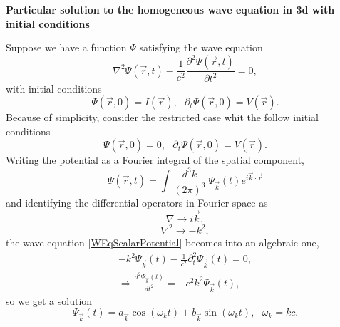 \documentclass[12pt,a4paper]{article}
\newcommand{\der}[2]{\frac{d #1}{d #2}} %
\begin{document}
\textbf{Particular solution to the homogeneous wave equation in 3d with initial conditions}

Suppose we have a function $\Psi$ satisfying the wave equation
\begin{equation}\label{WEqScalarPotential}
	\nabla ^{2}\Psi(\vec{r},t)-\frac{1}{c^{2}}\frac{\partial^{2}\Psi(\vec{r},t)}{\partial t^{2}}=0,
\end{equation}
with initial conditions
\begin{equation}
	\label{GeneralIntitialconditions}
	\Psi(\vec{r},0) = I(\vec{r}), \ \ \ \partial_t \Psi(\vec{r},0) = V(\vec{r}).
\end{equation}
Because of simplicity, consider the restricted case whit the follow initial conditions
\begin{equation}
	\label{ReestrictedIntitialcondition}
	\Psi(\vec{r},0) = 0, \ \ \ \partial_t \Psi(\vec{r},0) = V(\vec{r}).
\end{equation}
Writing the potential as a Fourier integral of the spatial component,
\begin{equation}
	\label{ScalarPotentialFT}
	\Psi(\vec{r},t) = \int{\frac{d^3k}{(2\pi)^3}}\  \Psi_{\vec{k}}(t)e^{i\vec{k}\cdot\vec
		r}
\end{equation}
and identifying the differential operators in Fourier space as
\[\nabla \rightarrow i\vec{k},\]
\[\nabla^{2} \rightarrow -k^{2},\]
the wave equation \ref{WEqScalarPotential} becomes into an algebraic one,
\begin{equation}
	\begin{split}\label{AlgebraicHWEforscalarpotential}
		-k^2 \Psi_{\vec{k}}(t) -\frac{1}{c^2}\partial_t^2\Psi_{\vec{k}}(t) = 0, \\
		 \Rightarrow \der{^2\Psi_{\vec{k}}(t)}{t^2} = - c^2k^2\Psi_{\vec{k}}(t),
	\end{split}
\end{equation}
so we get a solution
\begin{equation}\label{GeneralSacalarPotentialForHWE}
\Psi_{\vec{k}}(t) = a_{\vec{k}} \cos (\omega_k t) + b_{\vec{k}} \sin (\omega_k t), \ \ \ \omega_k = kc.
\end{equation}
\end{document}
